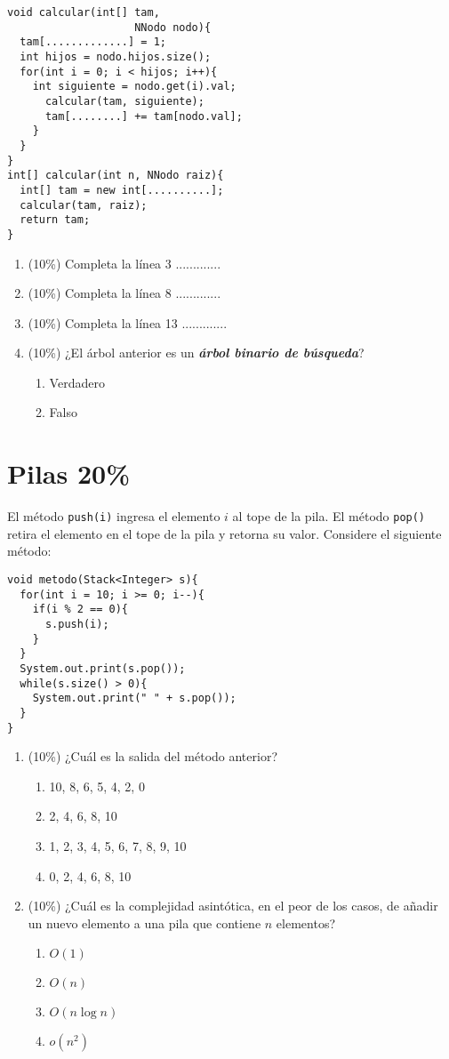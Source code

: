 \documentclass[10 pt]{article}
\begin{document}
\begin{multicols}{2}
\begin{lstlisting}
void calcular(int[] tam, 
                    NNodo nodo){
  tam[.............] = 1;
  int hijos = nodo.hijos.size();  
  for(int i = 0; i < hijos; i++){
    int siguiente = nodo.get(i).val;    
      calcular(tam, siguiente);
      tam[........] += tam[nodo.val];      
    }  
  }
}
int[] calcular(int n, NNodo raiz){  
  int[] tam = new int[..........];
  calcular(tam, raiz);
  return tam;
}
\end{lstlisting}
\begin{enumerate}[label=\alph*]
\item (10\%) Completa la línea 3  .............
\item (10\%) Completa la línea 8 .............
\item (10\%) Completa la línea 13 .............
\item (10\%) ¿El árbol anterior es un \textbf{\textit{árbol binario de búsqueda}}?
\begin{enumerate}[label=(\roman*)]
\item Verdadero
\item Falso
\end{enumerate}
\end{enumerate}
\section{Pilas 20\%}
El método \texttt{push(i)} ingresa el elemento $i$ al tope de la pila. El método \texttt{pop()} retira
el elemento en el tope de la pila y retorna su valor. Considere el siguiente método:
\begin{lstlisting}
void metodo(Stack<Integer> s){
  for(int i = 10; i >= 0; i--){
    if(i % 2 == 0){
      s.push(i);    
    }  
  }
  System.out.print(s.pop());
  while(s.size() > 0){
    System.out.print(" " + s.pop());  
  }
}
\end{lstlisting}
\begin{enumerate}[label=\alph*]
\item (10\%) ¿Cuál es la salida del método anterior?
\begin{enumerate}[label=(\roman*)]
\item 10, 8, 6, 5, 4, 2, 0
\item 2, 4, 6, 8, 10
\item 1, 2, 3, 4, 5, 6, 7, 8, 9, 10
\item 0, 2, 4, 6, 8, 10
\end{enumerate}
\item (10\%) ¿Cuál es la complejidad asintótica, en el peor de los casos, de añadir un nuevo elemento a una pila que contiene $n$ elementos?
\begin{enumerate}[label=(\roman*)]
\item $O(1)$
\item $O(n)$
\item $O(n \log n)$
\item $o(n^2)$
\end{enumerate}
\end{enumerate}

\end{multicols}
\end{document}
